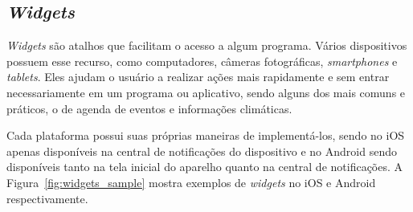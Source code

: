 \begin{comment}
\subsection{Acessibilidade} \label{subsec:acessibilidade}
Não se pode deixar de lado uma grande parcela da população que possui algum tipo de deficiência na hora de planejar novos sistemas e 
aplicativos. Cada plataforma possui seus próprios recursos para auxiliar pessoas com 
deficiência a utilizar os \textit{smartphones} e também possuem \textit{SDKs} que os desenvolvedores podem utilizar para deixar os 
aplicativos usáveis para todos. No iOS existem muitos recursos disponíveis como VoiceOver, 
Ditado e a própria Siri\footnote{\url{http://www.apple.com/br/accessibility/ios}}. No Android exite o TalkBack, BrailleBack e Acesso 
por voz\footnote{\url{https://support.google.com/accessibility/android}}. 

Importante ressaltar que os aplicativos aliados às tecnologias presentes nos \textit{smartphones} podem ajudar pessoas com deficiência 
a serem incluídas socialmente, a viverem melhor e até mesmo ajudar na reabilitação 
já que alguns aplicativos são usados para fisioterapia e aprendizado diferenciado como no caso de pessoas com autismo ou daltonismo.

https://github.com/phonegap/phonegap-mobile-accessibility
https://github.com/driftyco/ionic/issues/4100

\end{comment} 
 
\subsection{\textit{Widgets}} \label{subsec:widgets}
\textit{Widgets} são atalhos que facilitam o acesso a algum programa. Vários dispositivos possuem esse recurso, como computadores, câmeras fotográficas, \textit{smartphones} e \textit{tablets}. Eles ajudam o usuário a 
realizar ações mais rapidamente e sem entrar necessariamente em um programa ou aplicativo, sendo alguns dos mais comuns e práticos, o de agenda de eventos e informações climáticas.

Cada plataforma possui suas próprias maneiras de implementá-los, sendo no iOS apenas disponíveis na central de notificações do dispositivo e no Android sendo disponíveis tanto na tela inicial do aparelho quanto na central 
de notificações. A Figura~\ref{fig:widgets_sample} mostra exemplos de \textit{widgets} no iOS e Android respectivamente.

